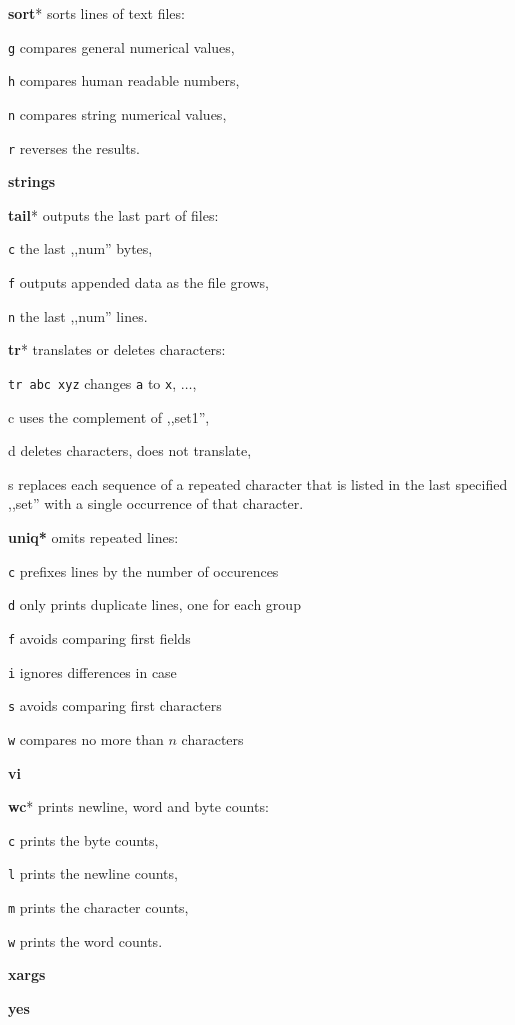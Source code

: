 \textbf{sort}* sorts lines of text files:
\begin{enumx}
	\item [\texttt{g}] compares general numerical values,
	\item [\texttt{h}] compares human readable numbers,
	\item [\texttt{n}] compares string numerical values,
	\item [\texttt{r}] reverses the results.
\end{enumx}

\textbf{strings}

\textbf{tail}* outputs the last part of files:
\begin{enumx}
	\item [\texttt{c}] the last ,,num'' bytes,
	\item [\texttt{f}] outputs appended data as the file grows,
	\item [\texttt{n}] the last ,,num'' lines.
\end{enumx}

\textbf{tr}* translates or deletes characters:
\begin{enumx}
	\item \texttt{tr abc xyz} changes \texttt{a} to \texttt{x}, $\ldots$,
	\item [c] uses the complement of ,,set1'',
	\item [d] deletes characters, does not translate,
	\item [s] replaces each sequence of a repeated character that is listed 
	in the last specified ,,set'' with a single occurrence of that character.
\end{enumx}

\textbf{uniq*} omits repeated lines:
\begin{enumx}
	\item [\texttt{c}] prefixes lines by the number of occurences
	\item [\texttt{d}] only prints duplicate lines, one for each group
	\item [\texttt{f}] avoids comparing first fields
	\item [\texttt{i}] ignores differences in case
	\item [\texttt{s}] avoids comparing first characters
	\item [\texttt{w}] compares no more than $n$ characters
\end{enumx}

\textbf{vi} 

\textbf{wc}* prints newline, word and byte counts:
\begin{enumx}
	\item [\texttt{c}] prints the byte counts,
	\item [\texttt{l}] prints the newline counts,
	\item [\texttt{m}] prints the character counts,
	\item [\texttt{w}] prints the word counts.
\end{enumx}

\textbf{xargs}

\textbf{yes}

